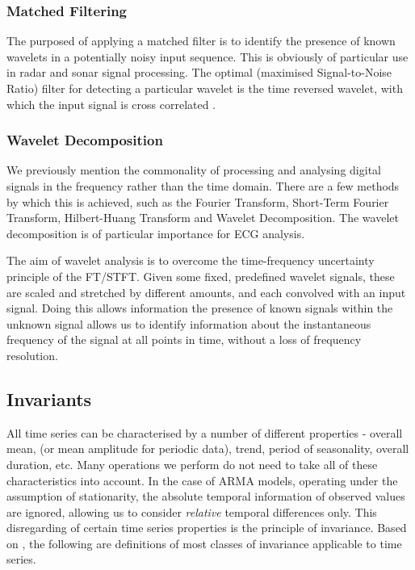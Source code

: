 \documentclass[9pt,conference]{IEEEtran}
\begin{document}
\subsubsection{Matched Filtering}
The purposed of applying a matched filter is to identify the presence of known wavelets in a potentially noisy input sequence. This is obviously of particular use in radar and sonar signal processing. The optimal (maximised Signal-to-Noise Ratio) filter for detecting a particular wavelet is the time reversed wavelet, with which the input signal is cross correlated \cite{bancroft2002introduction}.

\subsubsection{Wavelet Decomposition}

We previously mention the commonality of processing and analysing digital signals in the frequency rather than the time domain. There are a few methods by which this is achieved, such as the Fourier Transform, Short-Term Fourier Transform, Hilbert-Huang Transform and Wavelet Decomposition. The wavelet decomposition is of particular importance for ECG analysis.

The aim of wavelet analysis is to overcome the time-frequency uncertainty principle of the FT/STFT. Given some fixed, predefined wavelet signals, these are scaled and stretched by different amounts, and each convolved with an input signal. Doing this allows information the presence of known signals within the unknown signal allows us to identify information about the instantaneous frequency of the signal at all points in time, without a loss of frequency resolution.

\subsection{Invariants}
 All time series can be characterised by a number of different properties - overall mean, (or mean amplitude for periodic data), trend, period of seasonality, overall duration, etc. Many operations we perform do not need to take all of these characteristics into account. In the case of ARMA models, operating under the assumption of stationarity, the absolute temporal information of observed values are ignored, allowing us to consider \textit{relative} temporal differences only. This disregarding of certain time series properties is the principle of invariance. Based on \cite{batista2014cid}, the following are definitions of most classes of invariance applicable to time series.
\end{document}
